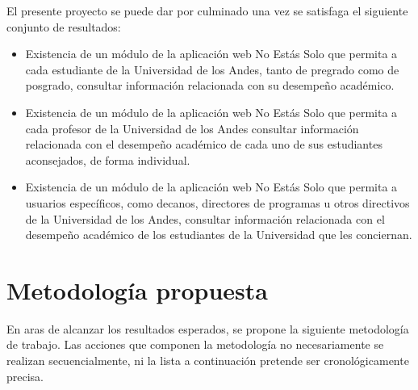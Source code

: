 \documentclass{fmbproyectogrado}
\begin{document}
El presente proyecto se puede dar por culminado una vez se satisfaga el siguiente conjunto de resultados:
\begin{itemize}
  \item Existencia de un módulo de la aplicación web No Estás Solo que permita a cada estudiante de la Universidad de los Andes, tanto de pregrado como de posgrado, consultar información relacionada con su desempeño académico.
  \item Existencia de un módulo de la aplicación web No Estás Solo que permita a cada profesor de la Universidad de los Andes consultar información relacionada con el desempeño académico de cada uno de sus estudiantes aconsejados, de forma individual.
  \item Existencia de un módulo de la aplicación web No Estás Solo que permita a usuarios específicos, como decanos, directores de programas u otros directivos de la Universidad de los Andes, consultar información relacionada con el desempeño académico de los estudiantes de la Universidad que les conciernan.
\end{itemize}


\section{Metodología propuesta}

En aras de alcanzar los resultados esperados, se propone la siguiente metodología de trabajo. Las acciones que componen la metodología no necesariamente se realizan secuencialmente, ni la lista a continuación pretende ser cronológicamente precisa.
\end{document}
